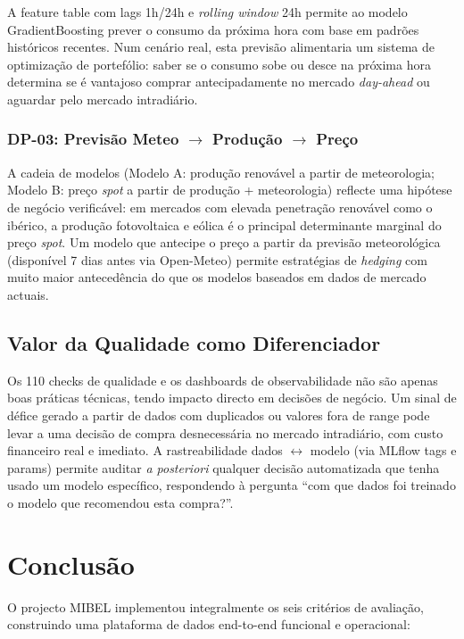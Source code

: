 \documentclass[11pt,a4paper]{article}
\begin{document}
A feature table  com lags 1h/24h e \textit{rolling window} 24h permite ao modelo GradientBoosting prever o consumo da próxima hora com base em padrões históricos recentes. Num cenário real, esta previsão alimentaria um sistema de optimização de portefólio: saber se o consumo sobe ou desce na próxima hora determina se é vantajoso comprar antecipadamente no mercado \textit{day-ahead} ou aguardar pelo mercado intradiário.

\subsubsection{\texorpdfstring{DP-03: Previsão Meteo $\rightarrow$ Produção $\rightarrow$ Preço}{DP-03: Previsão Meteo para Produção para Preço}}

A cadeia de modelos (Modelo A: produção renovável a partir de meteorologia; Modelo B: preço \textit{spot} a partir de produção + meteorologia) reflecte uma hipótese de negócio verificável: em mercados com elevada penetração renovável como o ibérico, a produção fotovoltaica e eólica é o principal determinante marginal do preço \textit{spot}. Um modelo que antecipe o preço a partir da previsão meteorológica (disponível 7 dias antes via Open-Meteo) permite estratégias de \textit{hedging} com muito maior antecedência do que os modelos baseados em dados de mercado actuais.

\subsection{Valor da Qualidade como Diferenciador}

Os 110 checks de qualidade e os dashboards de observabilidade não são apenas boas práticas técnicas, tendo impacto directo em decisões de negócio. Um sinal de défice gerado a partir de dados com duplicados ou valores fora de range pode levar a uma decisão de compra desnecessária no mercado intradiário, com custo financeiro real e imediato. A rastreabilidade dados $\leftrightarrow$ modelo (via MLflow tags e params) permite auditar \textit{a posteriori} qualquer decisão automatizada que tenha usado um modelo específico, respondendo à pergunta ``com que dados foi treinado o modelo que recomendou esta compra?''.

\section{Conclusão}

O projecto MIBEL implementou integralmente os seis critérios de avaliação, construindo uma plataforma de dados end-to-end funcional e operacional:
\end{document}
